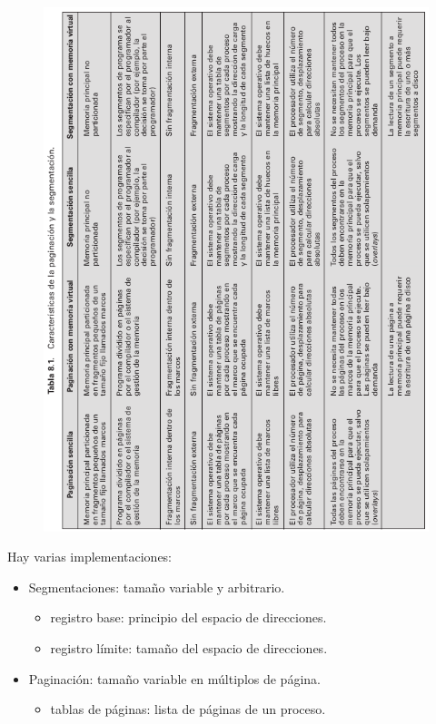\documentclass{article}
\begin{document}
\begin{figure}
\centering
\includegraphics[scale=1,width=\textwidth]{memvirtual.png}
\end{figure}
\newpage

Hay varias implementaciones:

\begin{itemize}
\item Segmentaciones: tamaño variable y arbitrario.
	\begin{itemize}
	\item registro base: principio del espacio de direcciones.
	\item registro límite: tamaño del espacio de direcciones.
	\end{itemize}

\item Paginación: tamaño variable en múltiplos de página.
	\begin{itemize}
	\item tablas de páginas: lista de páginas de un proceso.
	\end{itemize}
\end{itemize} 
\end{document}
